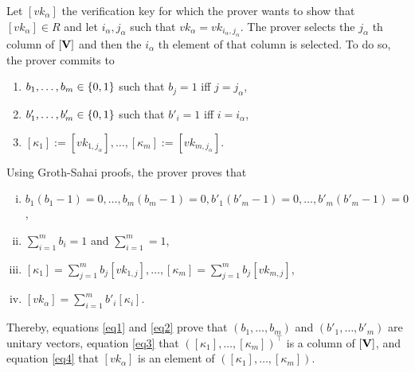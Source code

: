 Let $[vk_\alpha]$ the verification key for which the prover wants to show that $[vk_\alpha]\in R$ and let $i_\alpha,j_\alpha$ such that $vk_\alpha = vk_{i_\alpha,j_\alpha}$. The prover selects the $j_\alpha$ th column of $[\mathbf{{V}}]$ and then the $i_\alpha$ th element of that column is selected. To do so, the prover commits to 
\begin{enumerate}
\item $b_1,\ldots,b_m\in\{0,1\}$ such that $b_j=1$ iff $j=j_\alpha$,
\item $b'_1,\ldots,b'_m\in\{0,1\}$ such that $b'_i=1$ iff $i=i_\alpha$,
\item $[\kappa_1]:=[vk_{1,j_\alpha}],\ldots,[\kappa_m]:=[vk_{m,j_\alpha}]$.
\end{enumerate}

Using Groth-Sahai proofs, the prover proves that
\begin{enumerate}[i.]
\item $b_1(b_1-1)=0,\ldots,b_m(b_m-1)=0,b'_1(b'_m-1)=0,\ldots,b'_m(b'_m-1)=0$,\label{eq1}
\item $\sum_{i=1}^m b_i =1$ and $\sum_{i=1}^m=1$,\label{eq2}
\item $[\kappa_1]=\sum_{j=1}^m b_j [vk_{1,j}],\ldots,[\kappa_m]=\sum_{j=1}^m b_j[vk_{m,j}]$,\label{eq3}
\item $[vk_\alpha]=\sum_{i=1}^m b'_i[\kappa_i]$.\label{eq4}
\end{enumerate}
Thereby, equations \ref{eq1} and \ref{eq2} prove that $(b_1,\ldots,b_m)$ and $(b'_1,\ldots,b'_m)$ are unitary vectors, equation \ref{eq3} that $([\kappa_1],\ldots,[\kappa_m])^\top$ is a column of $[\mathbf{{V}}]$, and equation \ref{eq4} that $[vk_\alpha]$ is an element of $([\kappa_1],\ldots,[\kappa_m])$.

